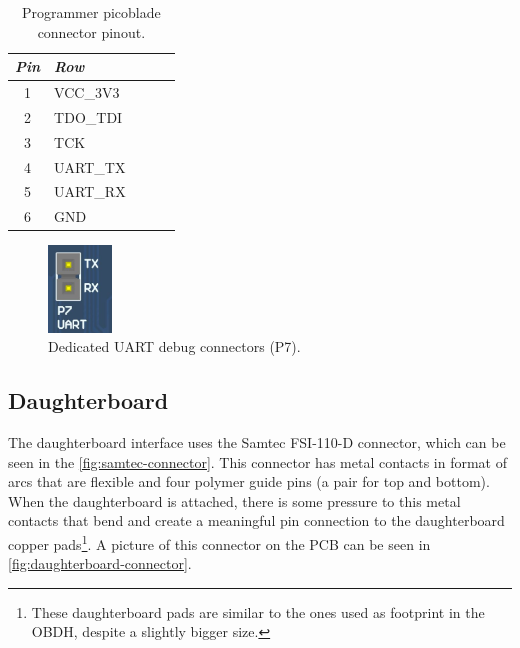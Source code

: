 \begin{table}[!h]
    \centering
    \begin{tabular}{cllll}
        \toprule[1.5pt]
        \textit{Pin} & \textit{Row} \\
        \midrule
        1            & VCC\_3V3       \\
        2            & TDO\_TDI       \\
        3            & TCK            \\
        4            & UART\_TX       \\
        5            & UART\_RX       \\
        6            & GND            \\
        \bottomrule[1.5pt]
    \end{tabular}
    \caption{Programmer picoblade connector pinout.}
    \label{tab:jtag-picoblade-connector-pins}
\end{table}

\begin{figure}[!ht]
    \begin{center}
        \includegraphics[width=0.15\textwidth]{figures/p7-connector.png}
        \caption{Dedicated UART debug connectors (P7).}
        \label{fig:uart-debug-connector}
    \end{center}
\end{figure}

\subsection{Daughterboard}

The daughterboard interface uses the Samtec FSI-110-D connector, which can be seen in the \autoref{fig:samtec-connector}. This connector has metal contacts in format of arcs that are flexible and four polymer guide pins (a pair for top and bottom). When the daughterboard is attached, there is some pressure to this metal contacts that bend and create a meaningful pin connection to the daughterboard copper pads\footnote{These daughterboard pads are similar to the ones used as footprint in the OBDH, despite a slightly bigger size.}. A picture of this connector on the PCB can be seen in \autoref{fig:daughterboard-connector}.

